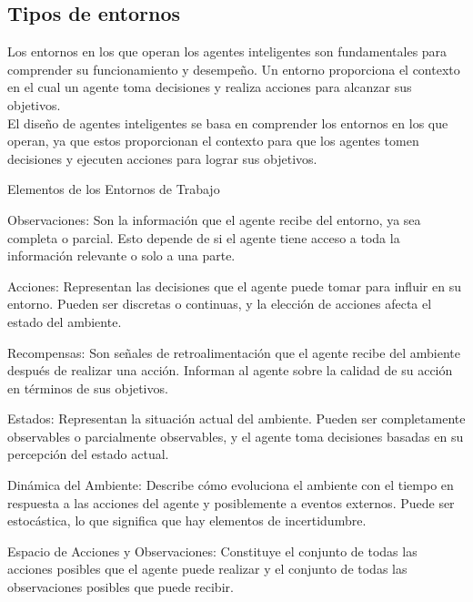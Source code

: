 \subsection*{Tipos de entornos}

Los entornos en los que operan los agentes inteligentes son fundamentales para comprender su
funcionamiento y desempeño. Un entorno proporciona el contexto en el cual un agente toma
decisiones y realiza acciones para alcanzar sus objetivos.\\ 

El diseño de agentes inteligentes se basa en comprender los entornos en los que operan, ya 
que estos proporcionan el contexto para que los agentes tomen decisiones y ejecuten 
acciones para lograr sus objetivos. 

\noindent \textcolor{Contraste4}{Elementos de los Entornos de Trabajo}\\

\begin{myitemize}
    \item Observaciones: Son la información que el agente recibe del entorno, ya sea completa o parcial. Esto depende de si el agente tiene acceso a toda la información relevante o solo a una parte.
    \item Acciones: Representan las decisiones que el agente puede tomar para influir en su entorno. Pueden ser discretas o continuas, y la elección de acciones afecta el estado del ambiente.
    \item Recompensas: Son señales de retroalimentación que el agente recibe del ambiente después de realizar una acción. Informan al agente sobre la calidad de su acción en términos de sus objetivos.
    \item Estados: Representan la situación actual del ambiente. Pueden ser completamente observables o parcialmente observables, y el agente toma decisiones basadas en su percepción del estado actual.
    \item Dinámica del Ambiente: Describe cómo evoluciona el ambiente con el tiempo en respuesta a las acciones del agente y posiblemente a eventos externos. Puede ser estocástica, lo que significa que hay elementos de incertidumbre.
    \item Espacio de Acciones y Observaciones: Constituye el conjunto de todas las acciones posibles que el agente puede realizar y el conjunto de todas las observaciones posibles que puede recibir.
\end{myitemize}


